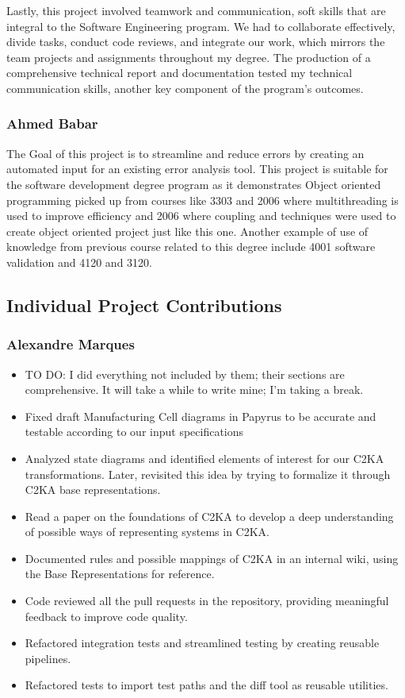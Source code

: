 Lastly, this project involved teamwork and communication, soft skills that are integral to the Software Engineering program. We had to collaborate effectively, divide tasks, conduct code reviews, and integrate our work, which mirrors the team projects and assignments throughout my degree. The production of a comprehensive technical report and documentation tested my technical communication skills, another key component of the program’s outcomes.


\subsubsection{Ahmed Babar}\label{subsubsec:ahmed-deg}
The Goal of this project is to streamline and reduce errors by creating an automated input for an existing error analysis tool. This project is suitable for the software development degree program as it demonstrates Object oriented programming picked up from courses like 3303 and 2006 where multithreading is used to improve efficiency and 2006 where coupling and techniques were used to create object oriented project just like this one. Another example of use of knowledge from previous course related to this degree include 4001 software validation and 4120 and 3120.

\subsection{Individual Project Contributions}\label{subsec:individual-project-contributions}
\subsubsection{Alexandre Marques}
\begin{itemize}
    \item TO DO: I did everything not included by them; their sections are comprehensive.
    It will take a while to write mine; I'm taking a break.
    \item Fixed draft Manufacturing Cell diagrams in Papyrus to be accurate and testable according to our input specifications
    \item Analyzed state diagrams and identified elements of interest for our C2KA transformations.
    Later, revisited this idea by trying to formalize it through C2KA base representations.
    \item Read a paper on the foundations of C2KA \cite{c2ka_foundations} to develop a deep understanding of possible ways of representing systems in C2KA. %
    \item Documented rules and possible mappings of C2KA in an internal wiki, using the Base Representations for reference. %
    \item Code reviewed all the pull requests in the repository, providing meaningful feedback to improve code quality.
    \item Refactored integration tests and streamlined testing by creating reusable pipelines.
    \item Refactored tests to import test paths and the diff tool as reusable utilities.
\end{itemize}

